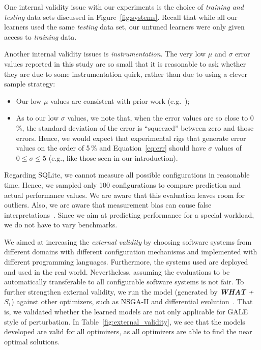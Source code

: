 \documentclass{newsig}
\newcommand{\fig}[1]{Figure~\ref{fig:#1}}
\newcommand{\eq}[1]{Equation~\ref{eq:#1}}
\newcommand{\what}{{\bf WHAT }}
\begin{document}
One internal validity issue with our experiments is the choice
of {\em training and testing} data sets discussed in 
\fig{systems}. Recall that while all our learners used the same
{\em testing} data set, our untuned learners were only given
access to {\em training} data.

Another internal validity issues is {\em instrumentation}. The very low $\mu$ and $\sigma$ error values
reported in this study are so small that it is reasonable to ask whether they are due to some instrumentation
quirk, rather than due to using a clever sample strategy:
\begin{itemize}
\item
Our low $\mu$ values are consistent with prior work (e.g.~\cite{sarkar2015cost});
\item
As to our low $\sigma$ values, we note that, when the  error values are so close to 0\,\%, the standard
deviation of the error is ``squeezed'' between zero and those errors. Hence, we would expect that
experimental rigs
that generate error values on the order of 5\,\% and \eq{err} should have $\sigma$ values of $0\le \sigma \le 5$ (e.g., like those seen in our introduction).
\end{itemize}

Regarding SQLite, we cannot measure all possible configurations in reasonable time. Hence, we sampled only 100 configurations to compare prediction and actual performance values. We are aware that this evaluation leaves room for outliers.
Also, we are aware that measurement bias can cause false interpretations~\cite{me12d}. Since we aim at predicting performance for a special workload, we do not have to vary benchmarks.



  We aimed at increasing the {\em external validity} by choosing software systems from different domains with different configuration mechanisms and implemented with different programming languages. Furthermore, the systems used are deployed and used in the real world. Nevertheless, assuming the evaluations to be automatically transferable  to all configurable software systems is not fair. To further strengthen external validity, we run the model (generated by \textit{\what + $S_1$}) against other optimizers, such as NSGA-II and differential evolution~\cite{storn1997differential}. That is, we validated whether the learned models are not only applicable for GALE style of perturbation. In Table~\ref{fig:external_validity}, we see that the models developed are valid for all optimizers, as all optimizers are able to find the near optimal solutions.
\end{document}
